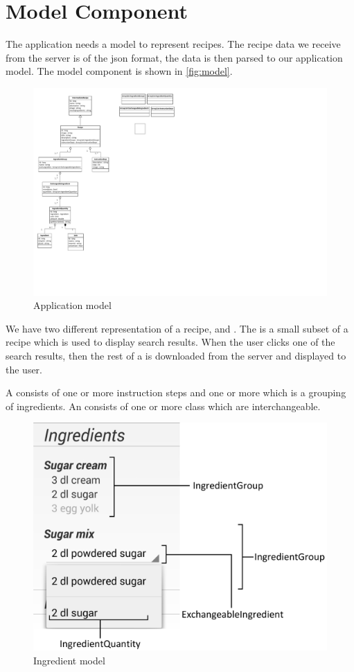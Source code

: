 \pagebreak
\section{Model Component}

The application needs a model to represent recipes. The recipe data we receive from the server is of the \ac{json} format, the data is then parsed to our application model. The model component is shown in \autoref{fig:model}.

\begin{figure}[H]
\centering
\includegraphics[width=0.67\linewidth, page=2]{img/model.pdf}
\caption{Application model}
\label{fig:model}
\end{figure}

We have two different representation of a recipe,  and . The  is a small subset of a recipe which is used to display search results. When the user clicks one of the search results, then the rest of a  is downloaded from the server and displayed to the user.

A  consists of one or more instruction steps and one or more  which is a grouping of ingredients. An  consists of one or more  class which are interchangeable. 

\begin{figure}[H]
\centering
\includegraphics[width=0.6\linewidth]{img/ingredients.pdf}
\caption{Ingredient model}
\label{fig:ingredients}
\end{figure}

